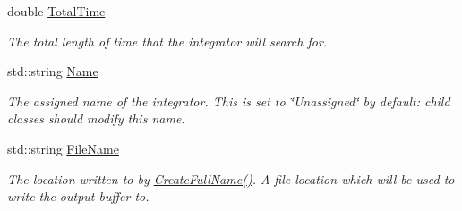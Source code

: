 \begin{DoxyCompactItemize}
double \hyperlink{classQDynamics_1_1Integrator_addfb67b6faa62d88bc7234d5496aeaf9}{Total\+Time}
\begin{DoxyCompactList}\small\item\em The total length of time that the integrator will search for. \end{DoxyCompactList}\item 
std\+::string \hyperlink{classQDynamics_1_1Integrator_aa3e27d68428619ab4083b2d42ef8924c}{Name}
\begin{DoxyCompactList}\small\item\em The assigned name of the integrator. This is set to \char`\"{}\+Unassigned\char`\"{} by default\+: child classes should modify this name. \end{DoxyCompactList}\item 
std\+::string \hyperlink{classQDynamics_1_1Integrator_a19ed0b9864ebe762914cee04cb0ad4b3}{File\+Name}
\begin{DoxyCompactList}\small\item\em The location written to by \hyperlink{classQDynamics_1_1Integrator_ae80ab509b96a9b996934d9ef127f5137}{Create\+Full\+Name()}. A file location which will be used to write the output buffer to. \end{DoxyCompactList}\end{DoxyCompactItemize}
